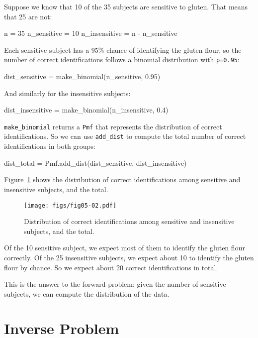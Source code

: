 \documentclass[12pt]{book}
\theoremstyle{exercise}
\newcommand{\py}[1]{{\tt #1}}%
\begin{document}
Suppose we know that 10 of the 35 subjects are sensitive to gluten.  That means that 25 are not:

\begin{code}
n = 35
n_sensitive = 10
n_insensitive = n - n_sensitive
\end{code}

Each sensitive subject has a 95\% chance of identifying the gluten flour, so the number of correct identifications follows a binomial distribution with \py{p=0.95}:

\begin{code}
dist_sensitive = make_binomial(n_sensitive, 0.95)
\end{code}

And similarly for the insensitive subjects:

\begin{code}
dist_insensitive = make_binomial(n_insensitive, 0.4)
\end{code}

\py{make_binomial} returns a \py{Pmf} that represents the distribution of correct identifications.
So we can use \py{add_dist} to compute the total number of correct identifications in both groups:

\begin{code}
dist_total = Pmf.add_dist(dist_sensitive, dist_insensitive)
\end{code}

Figure~\ref{fig05-02} shows the distribution of correct identifications among sensitive and insensitive subjects, and the total.

\begin{figure}
\centerline{\texttt{[image: figs/fig05-02.pdf]}}
\caption{Distribution of correct identifications among sensitive and insensitive subjects, and the total.}
\label{fig05-02}
\end{figure}

Of the 10 sensitive subject, we expect most of them to identify the gluten flour correctly.
Of the 25 insensitive subjects, we expect about 10 to identify the gluten flour by chance.
So we expect about 20 correct identifications in total.

This is the answer to the forward problem: given the number of sensitive subjects, we can compute the distribution of the data.

\section{Inverse Problem}
\end{document}
